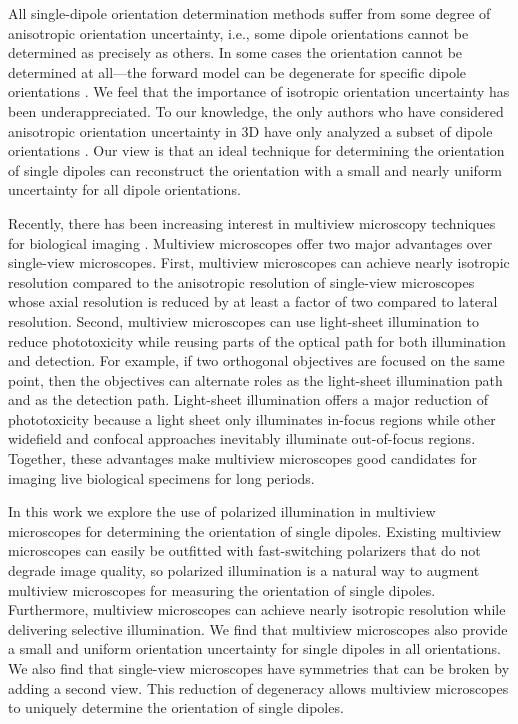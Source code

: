 \documentclass[10pt]{article}
\begin{document}
All single-dipole orientation determination methods suffer from some degree of
anisotropic orientation uncertainty, i.e., some dipole orientations cannot be
determined as precisely as others. In some cases the orientation cannot be
determined at all---the forward model can be degenerate for specific dipole
orientations \cite{fourkas2001, lu2008}. We feel that the importance of
isotropic orientation uncertainty has been underappreciated. To our knowledge,
the only authors who have considered anisotropic orientation uncertainty in 3D
have only analyzed a subset of dipole orientations \cite{agrawal2012}. Our view
is that an ideal technique for determining the orientation of single dipoles can
reconstruct the orientation with a small and nearly uniform uncertainty for all
dipole orientations.

Recently, there has been increasing interest in multiview microscopy techniques
for biological imaging \cite{wu2013, keller2015, wu2016, wu2017}. Multiview
microscopes offer two major advantages over single-view microscopes. First,
multiview microscopes can achieve nearly isotropic resolution compared to the
anisotropic resolution of single-view microscopes whose axial resolution is
reduced by at least a factor of two compared to lateral resolution. Second,
multiview microscopes can use light-sheet illumination to reduce phototoxicity
while reusing parts of the optical path for both illumination and detection. For
example, if two orthogonal objectives are focused on the same point, then the
objectives can alternate roles as the light-sheet illumination path and as the
detection path. Light-sheet illumination offers a major reduction of
phototoxicity because a light sheet only illuminates in-focus regions while
other widefield and confocal approaches inevitably illuminate out-of-focus
regions. Together, these advantages make multiview microscopes good candidates
for imaging live biological specimens for long periods.

In this work we explore the use of polarized illumination in multiview
microscopes for determining the orientation of single dipoles. Existing
multiview microscopes can easily be outfitted with fast-switching polarizers
that do not degrade image quality, so polarized illumination is a natural way to
augment multiview microscopes for measuring the orientation of single
dipoles. Furthermore, multiview microscopes can achieve nearly isotropic
resolution while delivering selective illumination. We find that multiview
microscopes also provide a small and uniform orientation uncertainty for single
dipoles in all orientations. We also find that single-view microscopes have
symmetries that can be broken by adding a second view. This reduction of
degeneracy allows multiview microscopes to uniquely determine the orientation of
single dipoles.
\end{document}
